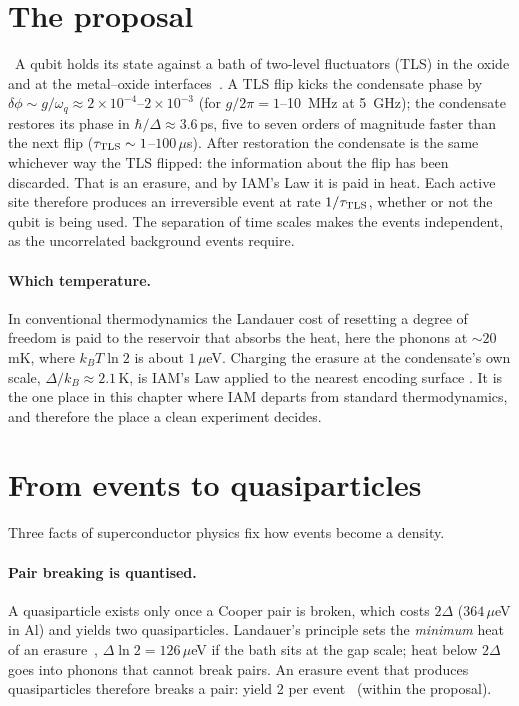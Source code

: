 \section{The proposal}
\conjecture\ A qubit holds its state against a bath of two-level fluctuators (TLS) in the oxide and at the metal--oxide interfaces~\cite{Phillips1987,Muller2019}. A TLS flip kicks the condensate
phase by $\delta\phi\sim g/\omega_q\approx2\times10^{-4}$--$2\times10^{-3}$ (for $g/2\pi=1$--10~MHz at 5~GHz); the condensate restores its phase in $\hbar/\Delta\approx3.6$\,ps, five to seven orders of magnitude faster than
the next flip ($\tau_{\rm TLS}\sim1$--$100\,\mu$s). After restoration the condensate is the same whichever way the TLS flipped: the information about
the flip has been discarded. That is an erasure, and by IAM's Law it is paid in heat. Each active site therefore produces an irreversible event at rate
$1/\tau_{\rm TLS}$, whether or not the qubit is being used. The separation of time scales makes the events independent, as the uncorrelated background
events require.
\paragraph{Which temperature.} In conventional thermodynamics the Landauer cost of resetting a degree of freedom is paid to the reservoir that
absorbs the heat, here the phonons at $\sim20$\,mK, where $k_BT\ln2$ is about $1\,\mu$eV. Charging the erasure at the condensate's own scale,
$\Delta/k_B\approx2.1$\,K, is IAM's Law applied to the nearest encoding surface \conjecture. It is the one place in this chapter where IAM departs from standard
thermodynamics, and therefore the place a clean experiment decides.

\section{From events to quasiparticles}
Three facts of superconductor physics fix how events become a density.
\paragraph{Pair breaking is quantised.} A quasiparticle exists only once a Cooper pair is broken, which costs $2\Delta$ ($364\,\mu$eV in Al) and yields
two quasiparticles. Landauer's principle sets the \emph{minimum} heat of an erasure~\cite{Landauer1961}, $\Delta\ln2=126\,\mu$eV if the bath sits at the gap scale;
heat below $2\Delta$ goes into phonons that cannot break pairs. An erasure event that produces quasiparticles therefore breaks a pair: yield $2$ per
event \derived\ (within the proposal).
